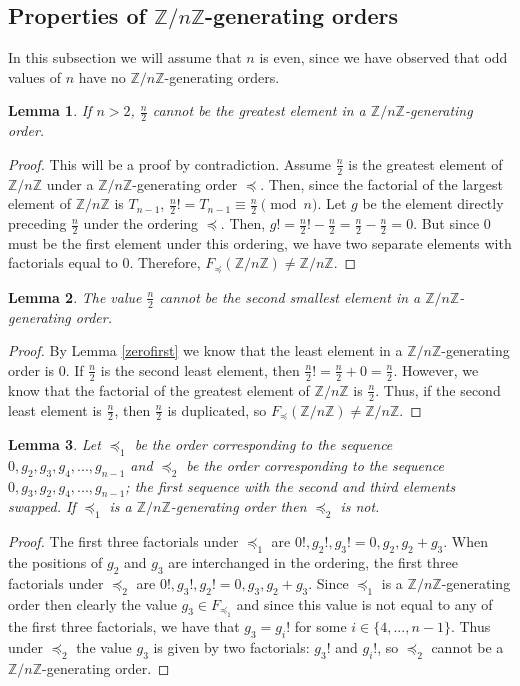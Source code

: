 \documentclass{article}
\newcommand{\ZZ}{\mathbb{Z}}
\newcommand{\ZnZ}{\ZZ/n\ZZ}
\newcommand{\FZ}{F_{\preceq}\left(\ZZ/n\ZZ\right)}
\newtheorem{lemma}{Lemma}
\begin{document}
\subsection{Properties of $\ZnZ$-generating orders}

In this subsection we will assume that $n$ is even, since we have observed that odd values of $n$ have no $\ZnZ$-generating orders.

\begin{lemma}
If $n>2$, $\frac{n}{2}$ cannot be the greatest element in a $\ZnZ$-generating order.
\end{lemma}
\begin{proof}
This will be a proof by contradiction. Assume $\frac{n}{2}$ is the greatest element of $\ZnZ$ under a $\ZnZ$-generating order $\preceq$. Then, since the factorial of the largest element of $\ZnZ$ is $T_{n-1}$, $\frac{n}{2}! = T_{n-1}\equiv\frac{n}{2}\pmod{n}$. Let $g$ be the element directly preceding $\frac{n}{2}$ under the ordering $\preceq$. Then, $g! = \frac{n}{2}! - \frac{n}{2} = \frac{n}{2}-\frac{n}{2} = 0$. But since $0$ must be the first element under this ordering, we have two separate elements with factorials equal to 0. Therefore, $\FZ \neq \ZnZ$. 
\end{proof}

\begin{lemma}
The value $\frac{n}{2}$ cannot be the second smallest element in a $\ZnZ$-generating order.
\end{lemma}
\begin{proof}
By Lemma \ref{zerofirst} we know that the least element in a $\ZnZ$-generating order is 0. If $\frac{n}{2}$ is the second least element, then $\frac{n}{2}! = \frac{n}{2}+0 = \frac{n}{2}$. However, we know that the factorial of the greatest element of $\ZnZ$ is $\frac{n}{2}$. Thus, if the second least element is $\frac{n}{2}$, then $\frac{n}{2}$ is duplicated, so $\FZ \neq \ZnZ$.
\end{proof}

\begin{lemma}
Let $\preceq_1$ be the order corresponding to the sequence $0, g_2, g_3,g_4,...,g_{n-1}$ and $\preceq_2$ be the order corresponding to the sequence $0, g_3, g_2,g_4,...,g_{n-1}$; the first sequence with the second and third elements swapped. If $\preceq_1$ is a $\ZnZ$-generating order then $\preceq_2$ is not. 
\end{lemma}
\begin{proof}
The first three factorials under $\preceq_1$ are $0!,g_2!, g_3! = 0,g_2,g_2+g_3$. When the positions of $g_2$ and $g_3$ are interchanged in the ordering, the first three factorials under $\preceq_2$ are $0!,g_3!, g_2! = 0,g_3,g_2+g_3$. Since $\preceq_1$ is a $\ZnZ$-generating order then clearly the value $g_3\in F_{\preceq_1}$ and since this value is not equal to any of the first three factorials, we have that $g_3=g_i!$ for some $i\in\{4,...,n-1\}$. Thus under $\preceq_2$ the value $g_3$ is given by two factorials: $g_3!$ and $g_i!$, so $\preceq_2$ cannot be a $\ZnZ$-generating order.
\end{proof}
\end{document}
